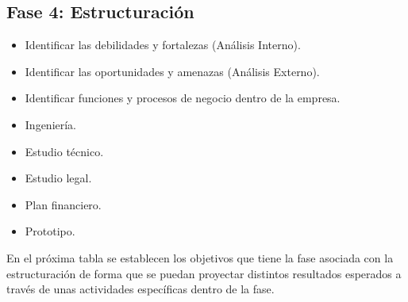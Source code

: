 {}
\subsection*{Fase 4: Estructuración}


\begin{itemize}
	\item Identificar las debilidades y fortalezas (Análisis Interno).
	
	\item Identificar las oportunidades y amenazas (Análisis Externo).
	
	\item Identificar funciones y procesos de negocio dentro de la empresa.
	
	\item Ingeniería.
	
	\item Estudio técnico.
	
	\item Estudio legal.
	
	\item Plan financiero.
	
	\item Prototipo.
\end{itemize}

En el próxima tabla se establecen los objetivos que tiene la fase asociada con la estructuración de forma que se puedan proyectar distintos resultados esperados a través de unas actividades específicas dentro de la fase.

